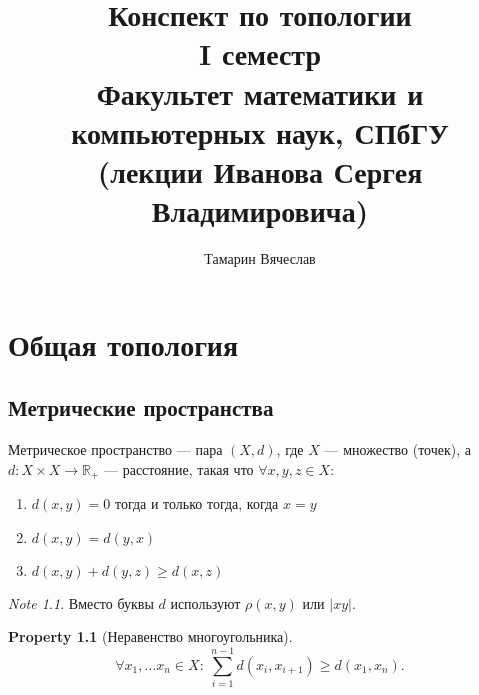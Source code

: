 \documentclass[11pt]{book}
\title{Конспект по топологии \\
    I семестр \\
    Факультет математики и компьютерных наук, СПбГУ\\
(лекции Иванова Сергея Владимировича)}
\author{Тамарин Вячеслав}
\newcommand{\R}{\mathbb{R}}
\renewcommand{\ge}{\geqslant}
\theoremstyle{definition}
\theoremstyle{plain}
\theoremstyle{plain}
\newtheorem*{prop}{Property}
\theoremstyle{definition}
\theoremstyle{remark}
\newtheorem*{note}{Note}
\begin{document}
\maketitle
\tableofcontents

\chapter{Общая топология}
\section{Метрические пространства}
\begin{defn}
    Метрическое пространство --- пара $ (X, d)$, где  $ X$ --- множество (точек),  а $ d: X \times X \to  \R_{+}$ --- расстояние, такая что $ \forall x, y, z \in X$:
    \begin{enumerate}
	\item $ d(x, y) = 0$  тогда и только тогда, когда $ x = y$
	\item  $ d(x, y) = d(y, x)$
	\item  $ d(x, y) + d(y, z) \ge d(x, z)$
    \end{enumerate}
\end{defn}
\begin{note}
    Вместо буквы $ d$ используют  $ \rho(x, y)$ или  $ |xy|$.
\end{note}
\begin{prop}[Неравенство многоугольника]
    \[
	\forall x_1, \ldots x_n \in X: ~ \sum_{i=1}^{n-1} d(x_{i}, x_{i+1}) \ge  d(x_1, x_{n})
    .\]
\end{prop}
\end{document}
